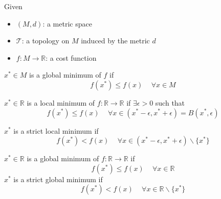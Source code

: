 \begin{definition}

    Given
    \begin{itemize}
        \item $(M,d)$: a metric space
        \item $\mathcal{T}$: a topology on $M$ induced by the metric $d$
        \item $f: M \rightarrow \mathbb{R}$: a cost function
    \end{itemize}

    $x^* \in M$ is a global minimum of $f$ if
    \begin{equation}
        f(x^*) \leq f(x)\,\quad \forall x \in M
    \end{equation}
    
\end{definition}

\begin{definition}

    $x^* \in \mathbb{R}$ is a local minimum of $f: \mathbb{R} \rightarrow \mathbb{R}$ if $\exists \epsilon > 0$ such that
    \begin{equation}
        f(x^*) \leq f(x)\,\quad \forall x \in (x^* - \epsilon, x^* + \epsilon) = B(x^*, \epsilon)
    \end{equation}

    $x^*$ is a strict local minimum if
    \begin{equation}
        f(x^*) < f(x)\,\quad \forall x \in (x^* - \epsilon, x^* + \epsilon)\backslash \{x^*\}
    \end{equation}

\end{definition}

\begin{definition}

    $x^* \in \mathbb{R}$ is a global minimum of $f: \mathbb{R} \rightarrow \mathbb{R}$ if
    \begin{equation}
        f(x^*) \leq f(x)\,\quad \forall x \in \mathbb{R}
    \end{equation}
    $x^*$ is a strict global minimum if
    \begin{equation}
        f(x^*) < f(x)\,\quad \forall x \in \mathbb{R}\backslash \{x^*\}
    \end{equation}
    
\end{definition}

